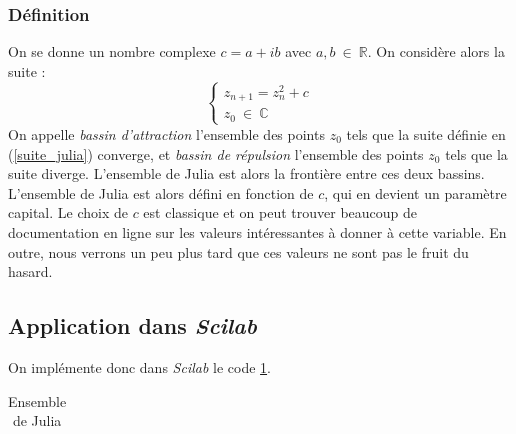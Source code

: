 \documentclass[a4paper,10pt]{report}
\begin{document}
\subsubsection{Définition}
On se donne un nombre complexe $c=a+ib$ avec $a,b\ \in \ \mathbb{R}$. On considère alors la suite :
\begin{equation}
\label{suite_julia}
\left\lbrace
\begin{array}{l}
z_{n+1}=z_n^2+c \\
z_0 \ \in \ \mathbb{C}
\end{array}\right.
\end{equation}
On appelle \textit{bassin d'attraction} l'ensemble des points $z_0$ tels que la suite définie en (\ref{suite_julia}) converge, et \textit{bassin de répulsion} l'ensemble des points $z_0$ tels que la suite diverge. L'ensemble de Julia est alors la frontière entre ces deux bassins. L'ensemble de Julia est alors défini en fonction de $c$, qui en devient un paramètre capital. Le choix de $c$ est classique et on peut trouver beaucoup de documentation en ligne sur les valeurs intéressantes à donner à cette variable. En outre, nous verrons un peu plus tard que ces valeurs ne sont pas le fruit du hasard.

\subsection{Application dans \textit{Scilab}}
On implémente donc dans \textit{Scilab} le code \ref{code_julia}.

\begin{table}[H]
\caption{Ensemble de Julia}
\begin{tabular}{l}
\\
\end{tabular}
\label{code_julia}
\end{table}
\end{document}
